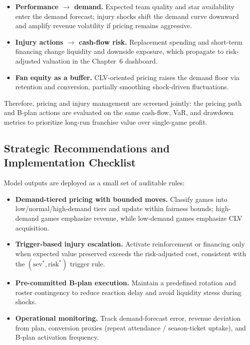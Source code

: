 \documentclass[12pt]{article}
\numberwithin{figure}{section}
\numberwithin{table}{section}
\begin{document}
	\begin{itemize}
		\item \textbf{Performance $\rightarrow$ demand.}
		Expected team quality and star availability enter the demand forecast; injury shocks shift the demand curve downward and amplify revenue volatility if pricing remains aggressive.
		
		\item \textbf{Injury actions $\rightarrow$ cash-flow risk.}
		Replacement spending and short-term financing change liquidity and downside exposure, which propagate to risk-adjusted valuation in the Chapter~6 dashboard.
		
		\item \textbf{Fan equity as a buffer.}
		CLV-oriented pricing raises the demand floor via retention and conversion, partially smoothing shock-driven fluctuations.
	\end{itemize}
	
	Therefore, pricing and injury management are screened jointly: the pricing path and B-plan actions are evaluated on the same cash-flow, VaR, and drawdown metrics to prioritize long-run franchise value over single-game profit.
	
	\subsection{Strategic Recommendations and Implementation Checklist}
	
	Model outputs are deployed as a small set of auditable rules:
	
	\begin{itemize}
		\item \textbf{Demand-tiered pricing with bounded moves.}
		Classify games into low/normal/high-demand tiers and update within fairness bounds; high-demand games emphasize revenue, while low-demand games emphasize CLV acquisition.
		
		\item \textbf{Trigger-based injury escalation.}
		Activate reinforcement or financing only when expected value preserved exceeds the risk-adjusted cost, consistent with the $(\mathrm{sev}^*,\mathrm{risk}^*)$ trigger rule.
		
		\item \textbf{Pre-committed B-plan execution.}
		Maintain a predefined rotation and roster contingency to reduce reaction delay and avoid liquidity stress during shocks.
		
		\item \textbf{Operational monitoring.}
		Track demand-forecast error, revenue deviation from plan, conversion proxies (repeat attendance / season-ticket uptake), and B-plan activation frequency.
	\end{itemize}
	
\end{document}
